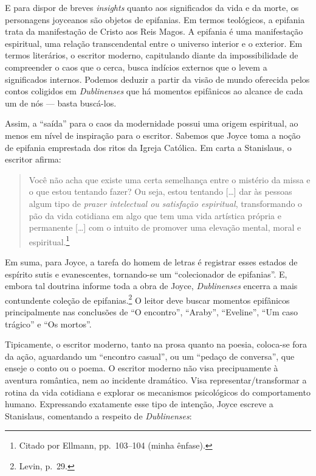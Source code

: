 E para dispor de breves \textit{insights} quanto aos significados da vida e da
morte, os personagens joyceanos são objetos de epifanias. Em termos teológicos,
a epifania trata da manifestação de Cristo aos Reis Magos.  A epifania é uma
manifestação espiritual, uma relação transcendental entre o universo interior e
o exterior. Em termos literários, o escritor moderno, capitulando diante da
impossibilidade de compreender o caos que o cerca, busca indícios externos que
o levem a significados internos. Podemos deduzir a partir da visão de mundo
oferecida pelos contos coligidos em \textit{Dublinenses} que há momentos
epifânicos ao alcance de cada um de nós --- basta buscá-los.

Assim, a “saída” para o caos da modernidade possui uma origem espiritual, ao
menos em nível de inspiração para o escritor. Sabemos que Joyce toma a noção de
epifania emprestada dos ritos da Igreja Católica. Em carta a Stanislaus, o
escritor afirma: 

\begin{quote}
Você não acha que existe uma certa semelhança entre o mistério da missa e o que
estou tentando fazer? Ou seja, estou tentando [\ldots{}] dar às pessoas algum tipo
de \textit{prazer intelectual ou satisfação espiritual}, transformando o pão da
vida cotidiana em algo que tem uma vida artística própria e permanente [\ldots{}]
com o intuito de promover uma elevação mental, moral e
espiritual.\footnote{ Citado por Ellmann, pp.~103--104 (minha ênfase).}
\end{quote}

Em suma, para Joyce, a tarefa do homem de letras é registrar esses estados de
espírito sutis e evanescentes, tornando-se um “colecionador de epifanias”. E,
embora tal doutrina informe toda a obra de Joyce, \textit{Dublinenses} encerra a
mais contundente coleção de epifanias.\footnote{ Levin, p.~29.} O leitor deve buscar
momentos epifânicos principalmente nas conclusões de “O encontro”, “Araby”,
“Eveline”, “Um caso trágico” e “Os mortos”.

Tipicamente, o escritor moderno, tanto na prosa quanto na poesia, coloca-se fora
da ação, aguardando um “encontro casual”, ou um “pedaço de conversa”, que
enseje o conto ou o poema. O escritor moderno não visa precipuamente à aventura
romântica, nem ao incidente dramático. Visa representar/transformar a rotina da
vida cotidiana e explorar os mecanismos psicológicos do comportamento humano.
Expressando exatamente esse tipo de intenção, Joyce escreve a Stanislaus,
comentando a respeito de \textit{Dublinenses}: 

